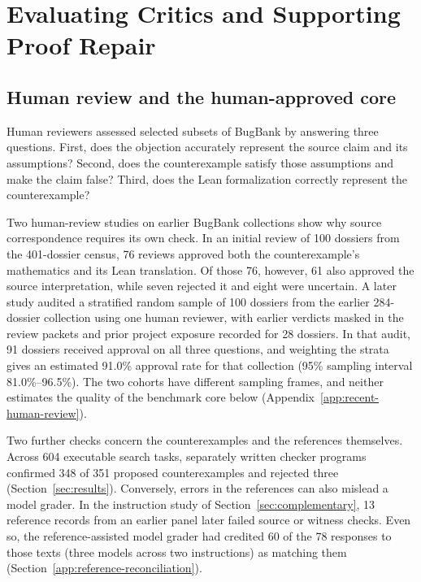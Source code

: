 \section{Evaluating Critics and Supporting Proof Repair}
\label{sec:evaluation}
\label{sec:certified-localization}

\subsection{Human review and the human-approved core}
Human reviewers assessed selected subsets of BugBank by answering three questions. First, does the objection accurately represent the source claim and its assumptions? Second, does the counterexample satisfy those assumptions and make the claim false? Third, does the Lean formalization correctly represent the counterexample?

Two human-review studies on earlier BugBank collections show why source correspondence requires its own check. In an initial review of 100 dossiers from the 401-dossier census, 76 reviews approved both the counterexample's mathematics and its Lean translation. Of those 76, however, 61 also approved the source interpretation, while seven rejected it and eight were uncertain. A later study audited a stratified random sample of 100 dossiers from the earlier 284-dossier collection using one human reviewer, with earlier verdicts masked in the review packets and prior project exposure recorded for 28 dossiers. In that audit, 91 dossiers received approval on all three questions, and weighting the strata gives an estimated 91.0\% approval rate for that collection (95\% sampling interval 81.0\%--96.5\%). The two cohorts have different sampling frames, and neither estimates the quality of the benchmark core below (Appendix~\ref{app:recent-human-review}).

Two further checks concern the counterexamples and the references themselves. Across 604 executable search tasks, separately written checker programs confirmed 348 of 351 proposed counterexamples and rejected three (Section~\ref{sec:results}). Conversely, errors in the references can also mislead a model grader. In the instruction study of Section~\ref{sec:complementary}, 13 reference records from an earlier panel later failed source or witness checks. Even so, the reference-assisted model grader had credited 60 of the 78 responses to those texts (three models across two instructions) as matching them (Section~\ref{app:reference-reconciliation}).

